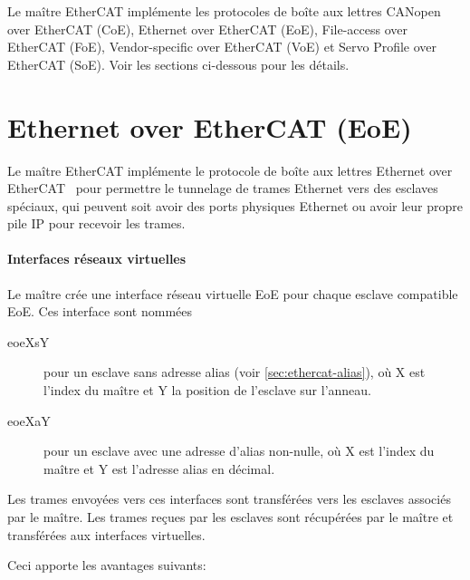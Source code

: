 \documentclass[a4paper,12pt,BCOR=6mm,bibtotoc,idxtotoc]{scrbook}
\begin{document}
Le ma\^itre EtherCAT impl\'emente les protocoles de bo\^ite aux
lettres CANopen over EtherCAT (CoE), Ethernet over EtherCAT (EoE),
File-access over EtherCAT (FoE), Vendor-specific over EtherCAT (VoE)
et Servo Profile over EtherCAT (SoE).  Voir les sections ci-dessous
pour les d\'etails.


\section{Ethernet over EtherCAT (EoE)}
\label{sec:eoe}

Le ma\^itre EtherCAT impl\'emente le protocole de bo\^ite aux lettres
Ethernet over EtherCAT~\cite[sec.~5.7]{alspec} pour permettre le
tunnelage de trames Ethernet vers des esclaves sp\'eciaux, qui peuvent
soit avoir des ports physiques Ethernet ou avoir leur propre pile IP
pour recevoir les trames.

\paragraph{Interfaces r\'eseaux virtuelles}

Le ma\^itre cr\'ee une interface r\'eseau virtuelle EoE pour chaque
esclave compatible EoE. Ces interface sont nomm\'ees

\begin{description}

\item[eoeXsY] pour un esclave sans adresse alias (voir
  \autoref{sec:ethercat-alias}), o\`u X est l'index du ma\^itre et Y
  la position de l'esclave sur l'anneau.

\item[eoeXaY] pour un esclave avec une adresse d'alias non-nulle, o\`u
  X est l'index du ma\^itre et Y est l'adresse alias en d\'ecimal.

\end{description}

Les trames envoy\'ees vers ces interfaces sont transf\'er\'ees vers les
esclaves associ\'es par le ma\^itre. Les trames re\c{c}ues par les esclaves
sont r\'ecup\'er\'ees par le ma\^itre et transf\'er\'ees aux interfaces
virtuelles.

Ceci apporte les avantages suivants:
\end{document}
